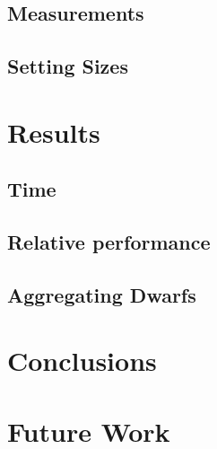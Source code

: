 \documentclass{sig-alternate}
\begin{document}
\subsection{Measurements}
\subsection{Setting Sizes}


\section{Results}\label{sec:results}
\subsection{Time}
\subsection{Relative performance}
\subsection{Aggregating Dwarfs}


\section{Conclusions}


\section{Future Work}





\newpage
\listoftodos[Notes]
\end{document}
